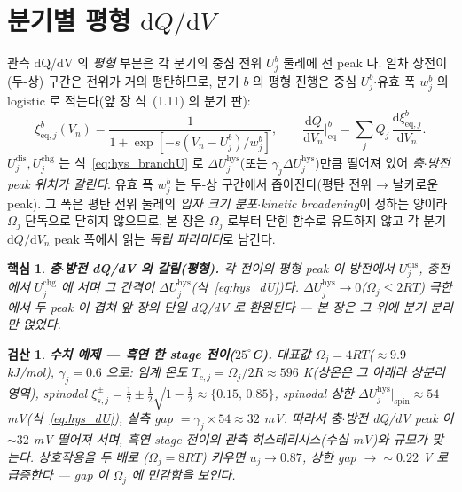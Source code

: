 \documentclass[11pt,a4paper]{article}
\newtheorem*{keybox}{핵심}
\newtheorem*{verifybox}{검산}
\newcommand{\dd}{\mathrm{d}}
\newcommand{\eq}{\mathrm{eq}}
\newcommand{\dis}{\mathrm{dis}}
\newcommand{\chg}{\mathrm{chg}}
\newcommand{\hys}{\mathrm{hys}}
\begin{document}
\section{분기별 평형 $\dd Q/\dd V$}\label{sec:hys_dQdV}
관측 dQ/dV 의 \emph{평형} 부분은 각 분기의 중심 전위 $U_j^b$ 둘레에 선 peak 다. 일차 상전이(두-상) 구간은
전위가 거의 평탄하므로, 분기 $b$ 의 평형 진행은 중심 $U_j^b$$\cdot$유효 폭 $w_j^b$ 의 logistic 로 적는다(앞 장
식~(1.11) 의 분기 판):
\begin{equation}
\xi_{\eq,j}^b(V_n)=\frac{1}{1+\exp[-s(V_n-U_j^b)/w_j^b]},\qquad
\frac{\dd Q}{\dd V_n}\Big|_{\eq}^b=\sum_{j}Q_j\,\frac{\dd\xi_{\eq,j}^b}{\dd V_n}.
\label{eq:hys_dQdV}
\end{equation}
$U_j^\dis,U_j^\chg$ 는 식~\eqref{eq:hys_branchU} 로 $\Delta U_j^\hys$(또는 $\gamma_j\Delta U_j^\hys$)만큼 떨어져
있어 \emph{충$\cdot$방전 peak 위치가 갈린다}. 유효 폭 $w_j^b$ 는 두-상 구간에서 좁아진다(평탄 전위 → 날카로운
peak). 그 폭은 평탄 전위 둘레의 \emph{입자 크기 분포$\cdot$kinetic broadening}이 정하는 양이라 $\Omega_j$ 단독으로
닫히지 않으므로, 본 장은 $\Omega_j$ 로부터 닫힌 함수로 유도하지 않고 각 분기 $\dd Q/\dd V_n$ peak 폭에서 읽는
\emph{독립 파라미터}로 남긴다.
\begin{keybox}
\textbf{충$\cdot$방전 dQ/dV 의 갈림(평형).} 각 전이의 평형 peak 이 방전에서 $U_j^\dis$, 충전에서 $U_j^\chg$ 에
서며 그 간격이 $\Delta U_j^\hys$(식~\eqref{eq:hys_dU})다. $\Delta U_j^\hys\to0$($\Omega_j\le2RT$) 극한에서 두
peak 이 겹쳐 앞 장의 단일 dQ/dV 로 환원된다 — 본 장은 그 위에 \emph{분기 분리}만 얹었다.
\end{keybox}
\begin{verifybox}
\textbf{수치 예제 — 흑연 한 stage 전이($25^\circ$C).} 대표값 $\Omega_j=4RT$($\approx9.9$ kJ/mol),
$\gamma_j=0.6$ 으로: 임계 온도 $T_{c,j}=\Omega_j/2R\approx596$ K(상온은 그 아래라 상분리 영역), spinodal
$\xi_{s,j}^\pm=\tfrac12\pm\tfrac12\sqrt{1-\tfrac12}\approx\{0.15,\,0.85\}$, spinodal 상한 $\Delta U_j^\hys|_\mathrm{spin}
\approx54$ mV(식~\eqref{eq:hys_dU}), 실측 gap $=\gamma_j\!\times\!54\approx32$ mV. 따라서 충$\cdot$방전 dQ/dV peak
이 $\sim32$ mV 떨어져 서며, 흑연 stage 전이의 관측 히스테리시스(수십 mV)와 규모가 맞는다. 상호작용을 두 배로
($\Omega_j=8RT$) 키우면 $u_j\to0.87$, 상한 gap $\to\sim0.22$ V 로 급증한다 — gap 이 $\Omega_j$ 에 민감함을 보인다.
\end{verifybox}

\end{document}
